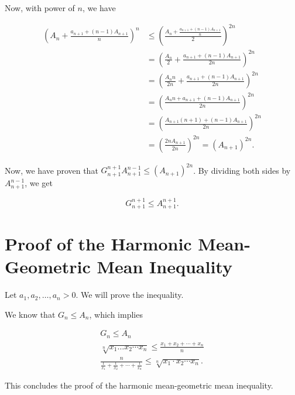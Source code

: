 Now, with power of \(n\), we have

\begin{align*}
	{\left( A_{n} + \frac{a_{n + 1} + (n - 1)A_{n + 1}}{n} \right)}^{n} & \leq {\left( \frac{A_{n} + \frac{a_{n + 1} + (n - 1)A_{n + 1}}{n}}{2} \right)}^{2n} \\
	                                                                    & = {\left( \frac{A_n}{2} + \frac{a_{n + 1} + (n - 1)A_{n + 1}}{2n}\right)}^{2n}      \\
	                                                                    & = {\left( \frac{A_n n}{2n} + \frac{a_{n + 1} + (n - 1)A_{n + 1}}{2n}\right)}^{2n}   \\
	                                                                    & = {\left( \frac{A_n n  + a_{n + 1} + (n - 1)A_{n + 1}}{2n}\right)}^{2n}             \\
	                                                                    & = {\left( \frac{A_{n + 1}(n + 1) + (n - 1)A_{n + 1}}{2n}\right)}^{2n}               \\
	                                                                    & = {\left( \frac{2n A_{n + 1}}{2n}\right)}^{2n} = {\left(A_{n + 1}\right)}^{2n}.
\end{align*}

Now, we have proven that \(G_{n + 1}^{n + 1} A_{n + 1}^{n - 1}\leq {\left(A_{n + 1}\right)}^{2n}\).
By dividing both sides by \( A_{n + 1}^{n - 1} \), we get

\[
	G_{n + 1}^{n + 1}\leq A_{n + 1}^{n + 1}.
\]

\QED

\section{Proof of the Harmonic Mean-Geometric Mean Inequality}

Let \( a_1, a_2, \dots, a_n > 0 \). We will prove the inequality.

We know that \(G_n \leq A_n\), which implies

\begin{align*}
	G_n \leq A_n                                                               \\
	\sqrt[n]{x_1 \dots x_2 \cdots x_n} \leq \frac{x_1 + x_2 + \cdots + x_n}{n} \\
	\frac{n}{\frac{1}{x_1} + \frac{1}{x_2} + \cdots + \frac{1}{x_n}} \leq \sqrt[n]{x_1 \cdot x_2 \cdots x_n}.
\end{align*}

This concludes the proof of the harmonic mean-geometric mean inequality.

\QED
